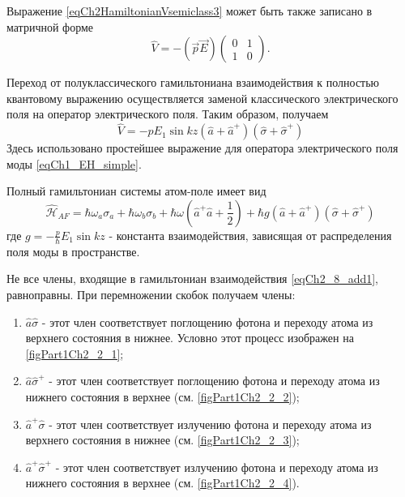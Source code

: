 Выражение \eqref{eqCh2HamiltonianVsemiclass3} может быть также
записано в матричной форме 
\begin{equation}
\hat{V} = - \left(\vec{p} \vec{E}\right)
\left(
\begin{array} {cc}
0 & 1  
\\
1 & 0 
\end{array}
\right).
\label{eqCh2_8}
\end{equation}

Переход от полуклассического гамильтониана взаимодействия к полностью
квантовому выражению осуществляется заменой классического
электрического поля на оператор электрического поля. Таким
образом, получаем 
\begin{equation}
\hat{V} = - p E_1 \sin k z \left(\hat{a} + \hat{a}^{+}\right)
\left(\hat{\sigma} + \hat{\sigma}^{+}\right)
\label{eqCh2_8_add1}
\end{equation}
Здесь использовано простейшее выражение для оператора электрического
поля моды \eqref{eqCh1_EH_simple}. 

Полный гамильтониан системы атом-поле имеет вид
\begin{equation}
\hat{\mathcal{H}}_{AF} = 
\hbar \omega_a \sigma_a + \hbar \omega_b \sigma_b +
\hbar \omega 
\left(\hat{a}^{+}\hat{a} + \frac{1}{2}\right)
+ \hbar g \left(\hat{a} + \hat{a}^{+}\right)
\left(\hat{\sigma} + \hat{\sigma}^{+}\right)
\nonumber
\end{equation}
где $g = -\frac{p}{\hbar}E_1 \sin k z$ - константа взаимодействия,
зависящая от распределения поля моды в пространстве.  










Не все члены, входящие в гамильтониан взаимодействия
\eqref{eqCh2_8_add1}, равноправны. При перемножении скобок получаем
члены: 
\begin{enumerate}
\item $\hat{a}\hat{\sigma}$ - этот член соответствует поглощению
  фотона и переходу атома из верхнего состояния в нижнее. Условно этот
  процесс изображен на \autoref{figPart1Ch2_2_1};  
\item $\hat{a}\hat{\sigma}^{+}$ - этот член соответствует поглощению
  фотона и переходу атома из нижнего состояния в верхнее (см. \autoref{figPart1Ch2_2_2});  
\item $\hat{a}^{+}\hat{\sigma}$ - этот член соответствует излучению
  фотона и переходу атома из верхнего состояния в нижнее (см. \autoref{figPart1Ch2_2_3}); 
\item $\hat{a}^{+}\hat{\sigma}^{+}$ - этот член соответствует
  излучению фотона и переходу атома из нижнего состояния в верхнее (см. \autoref{figPart1Ch2_2_4}). 
\end{enumerate}


